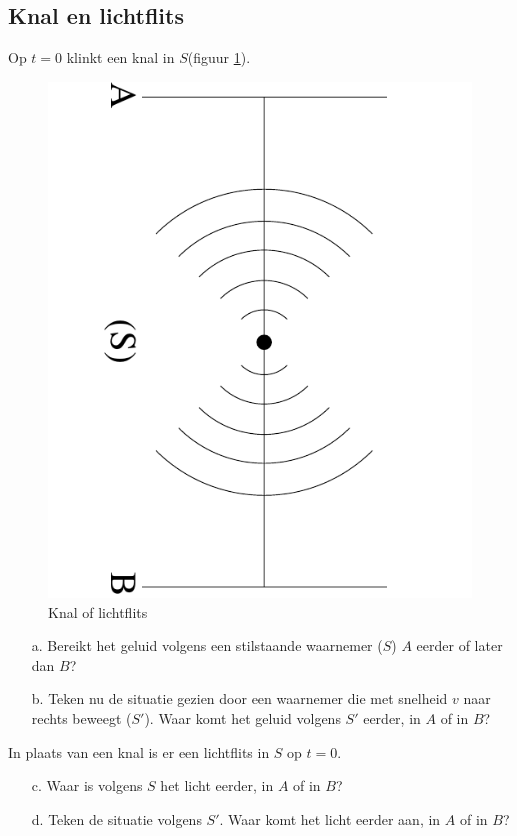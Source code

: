\subsection{Knal en lichtflits}
Op $t = 0$ klinkt een knal in $S$(figuur \ref{f:knal}).


\begin{figure}[ht]
\centering
\includegraphics[width=.8\textwidth]{oefeningen.pictures/flash}
\caption{Knal of lichtflits}
\label{f:knal}
\end{figure}

\begin{itemize}
\item [a.]
Bereikt  het geluid volgens een stilstaande waarnemer ($S$) $A$ eerder of 
later dan $B$? 
\item [b.]
Teken  nu  de  situatie gezien door een waarnemer die met snelheid $v$ 
naar rechts beweegt ($S'$). 
Waar komt het geluid volgens $S'$ eerder, in $A$ of in $B$? 
\end{itemize}
In plaats van een knal is er een lichtflits in $S$ op $t = 0$. 
\begin{itemize}
\item [c.]
Waar is volgens $S$ het licht eerder, in $A$ of in $B$? 
\item [d.]
Teken  de situatie volgens $S'$. 
Waar komt het licht eerder aan, in $A$ of in $B$? 
\end{itemize}

